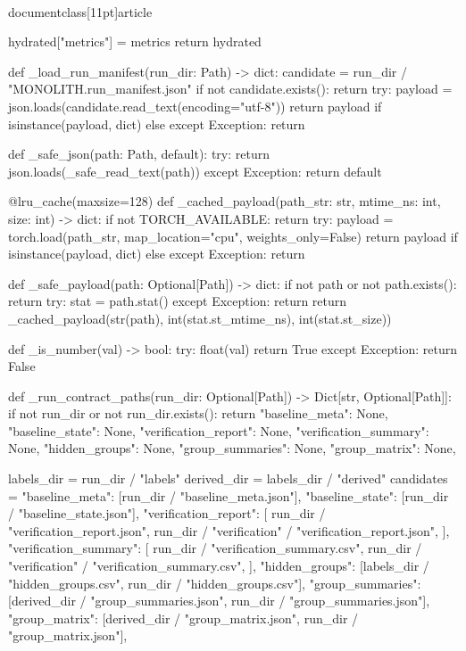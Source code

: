 \\documentclass[11pt]{article}
\begin{document}
\begin{CodeBlock}
    hydrated["metrics"] = metrics
    return hydrated


def _load_run_manifest(run_dir: Path) -> dict:
    candidate = run_dir / "MONOLITH.run_manifest.json"
    if not candidate.exists():
        return {}
    try:
        payload = json.loads(candidate.read_text(encoding="utf-8"))
        return payload if isinstance(payload, dict) else {}
    except Exception:
        return {}


def _safe_json(path: Path, default):
    try:
        return json.loads(_safe_read_text(path))
    except Exception:
        return default


@lru_cache(maxsize=128)
def _cached_payload(path_str: str, mtime_ns: int, size: int) -> dict:
    if not TORCH_AVAILABLE:
        return {}
    try:
        payload = torch.load(path_str, map_location="cpu", weights_only=False)
        return payload if isinstance(payload, dict) else {}
    except Exception:
        return {}


def _safe_payload(path: Optional[Path]) -> dict:
    if not path or not path.exists():
        return {}
    try:
        stat = path.stat()
    except Exception:
        return {}
    return _cached_payload(str(path), int(stat.st_mtime_ns), int(stat.st_size))


def _is_number(val) -> bool:
    try:
        float(val)
        return True
    except Exception:
        return False


def _run_contract_paths(run_dir: Optional[Path]) -> Dict[str, Optional[Path]]:
    if not run_dir or not run_dir.exists():
        return {
            "baseline_meta": None,
            "baseline_state": None,
            "verification_report": None,
            "verification_summary": None,
            "hidden_groups": None,
            "group_summaries": None,
            "group_matrix": None,
        }

    labels_dir = run_dir / "labels"
    derived_dir = labels_dir / "derived"
    candidates = {
        "baseline_meta": [run_dir / "baseline_meta.json"],
        "baseline_state": [run_dir / "baseline_state.json"],
        "verification_report": [
            run_dir / "verification_report.json",
            run_dir / "verification" / "verification_report.json",
        ],
        "verification_summary": [
            run_dir / "verification_summary.csv",
            run_dir / "verification" / "verification_summary.csv",
        ],
        "hidden_groups": [labels_dir / "hidden_groups.csv", run_dir / "hidden_groups.csv"],
        "group_summaries": [derived_dir / "group_summaries.json", run_dir / "group_summaries.json"],
        "group_matrix": [derived_dir / "group_matrix.json", run_dir / "group_matrix.json"],
    }


\end{CodeBlock}
\end{document}

